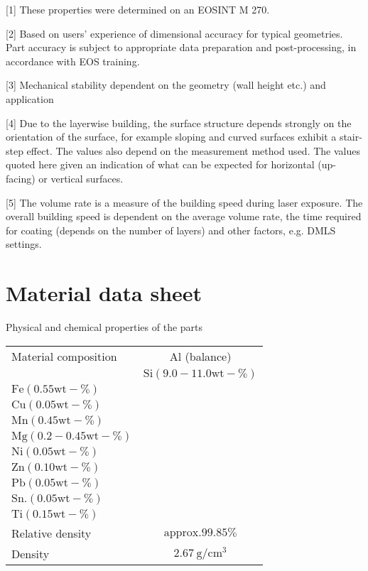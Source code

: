 \documentclass[10pt]{article}
\begin{document}
[1] These properties were determined on an EOSINT M 270.

[2] Based on users' experience of dimensional accuracy for typical geometries. Part accuracy is subject to appropriate data preparation and post-processing, in accordance with EOS training.

[3] Mechanical stability dependent on the geometry (wall height etc.) and application

[4] Due to the layerwise building, the surface structure depends strongly on the orientation of the surface, for example sloping and curved surfaces exhibit a stair-step effect. The values also depend on the measurement method used. The values quoted here given an indication of what can be expected for horizontal (up-facing) or vertical surfaces.

[5] The volume rate is a measure of the building speed during laser exposure. The overall building speed is dependent on the average volume rate, the time required for coating (depends on the number of layers) and other factors, e.g. DMLS settings.

\section*{Material data sheet}
Physical and chemical properties of the parts

\begin{center}
\begin{tabular}{lc}
\hline
Material composition & $\mathrm{Al}$ (balance) \\
 & $\mathrm{Si}(9.0-11.0 \mathrm{wt}-\%)$ \\
$\mathrm{Fe}(0.55 \mathrm{wt}-\%)$ &  \\
$\mathrm{Cu}(0.05 \mathrm{wt}-\%)$ &  \\
$\mathrm{Mn}(0.45 \mathrm{wt}-\%)$ &  \\
$\mathrm{Mg}(0.2-0.45 \mathrm{wt}-\%)$ &  \\
$\mathrm{Ni}(0.05 \mathrm{wt}-\%)$ &  \\
$\mathrm{Zn}(0.10 \mathrm{wt}-\%)$ &  \\
$\mathrm{Pb}(0.05 \mathrm{wt}-\%)$ &  \\
$\mathrm{Sn} .(0.05 \mathrm{wt}-\%)$ &  \\
$\mathrm{Ti}(0.15 \mathrm{wt}-\%)$ &  \\
\hline
Relative density & $\mathrm{approx.99.85 \%}$ \\
\hline
Density & $2.67 \mathrm{~g} / \mathrm{cm}^{3}$ \\
\hline
\end{tabular}
\end{center}
\end{document}
